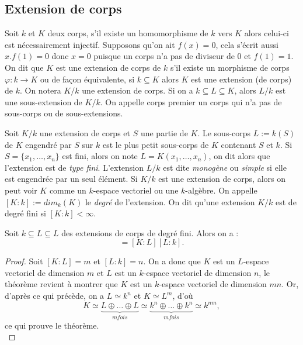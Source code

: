 \documentclass[a4paper]{article} %
\numberwithin{section}{part}
\numberwithin{equation}{section}
\begin{document}
\subsection{Extension de corps}
\label{def:degext}
Soit $k$ et $K$ deux corps, s'il existe un homomorphisme de $k$ vers $K$ alors
celui-ci est nécessairement injectif. Supposons qu'on ait $f(x) = 0$, cela
s'écrit aussi $x.f(1) = 0$ donc $x = 0$ puisque un corps n'a pas de diviseur de
$0$ et $f(1) = 1$. 
On dit que $K$ est une extension de corps de $k$ s'il existe un morphisme de 
corps $\varphi : k \to K$ ou de façon équivalente, si $k \subseteq K$ alors $K$
est une extension (de corps) de $k$. On notera $K/k$ une extension de corps.
Si on a $k\subseteq L \subseteq K$, alors $L/k$ est une sous-extension de
$K/k$. On appelle corps premier un corps qui n'a pas de sous-corps ou de
sous-extensions.\par
Soit $K/k$ une extension de corps et $S$ une partie de $K$. Le sous-corps $L := 
k(S)$ de $K$ engendré par $S$ sur $k$ est le plus petit sous-corps de $K$ 
contenant $S$ et $k$. Si $S = \lbrace x_1,\dots,x_n \rbrace$ est fini, alors on 
note $L = K(x_1,\dots,x_n)$, on dit alors que l'extension est de \emph{type
fini}. L'extension $L/k$ est dite \emph{monogène} ou \emph{simple} si elle est
engendrée par un seul élément. Si $K/k$ est une extension de corps, alors on 
peut voir $K$ comme un $k$-espace vectoriel ou une $k$-algèbre. On appelle 
$[K:k] := dim_k(K)$ le \emph{degré} de l'extension. On dit qu'une extension 
$K/k$ est de degré fini si $[K:k] < \infty$.\par

\begin{thm}
Soit $k \subseteq L \subseteq L$ des extensions de corps de degré fini. Alors on
a :
\begin{equation}
[K:k] = [K:L][L:k].
\end{equation}
\end{thm}
\begin{proof}
Soit $[K:L] = m$ et $[L:k] = n$. On a donc que $K$ est un $L$-espace vectoriel 
de dimension $m$ et $L$ est un $k$-espace vectoriel de dimension $n$, le 
théorème revient à montrer que $K$ est un $k$-espace vectoriel de dimension 
$mn$. Or, d'après ce qui précède, on a $L \simeq k^n$ et $K \simeq L^m$, d'où
\begin{equation}
K \simeq \underbrace{L \oplus\dots\oplus L}_{m fois}\simeq\underbrace
{k^n\oplus\dots\oplus k^n}_{m fois} \simeq k^{nm},
\end{equation}
ce qui prouve le théorème.\\
\end{proof}
\end{document}

